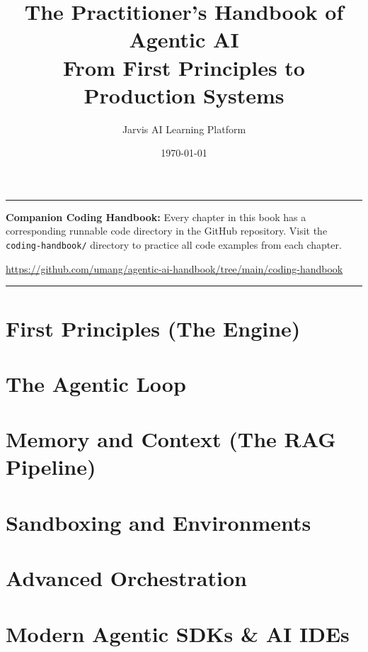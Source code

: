 \documentclass[11pt,a4paper,oneside]{book}
\title{\textbf{The Practitioner's Handbook of Agentic AI} \\
\Large From First Principles to Production Systems}
\author{Jarvis AI Learning Platform}
\date{\today}
\begin{document}
\maketitle

\tableofcontents
\newpage

\noindent\rule{\textwidth}{0.4pt}
\vspace{0.5em}

\noindent\textbf{Companion Coding Handbook:} Every chapter in this book has a corresponding runnable code directory in the GitHub repository. Visit the \texttt{coding-handbook/} directory to practice all code examples from each chapter.

\noindent\url{https://github.com/umang/agentic-ai-handbook/tree/main/coding-handbook}

\vspace{0.5em}
\noindent\rule{\textwidth}{0.4pt}
\newpage

\part{First Principles (The Engine)}



\part{The Agentic Loop}



\part{Memory and Context (The RAG Pipeline)}




\part{Sandboxing and Environments}


\part{Advanced Orchestration}



\part{Modern Agentic SDKs \& AI IDEs}


\end{document}
